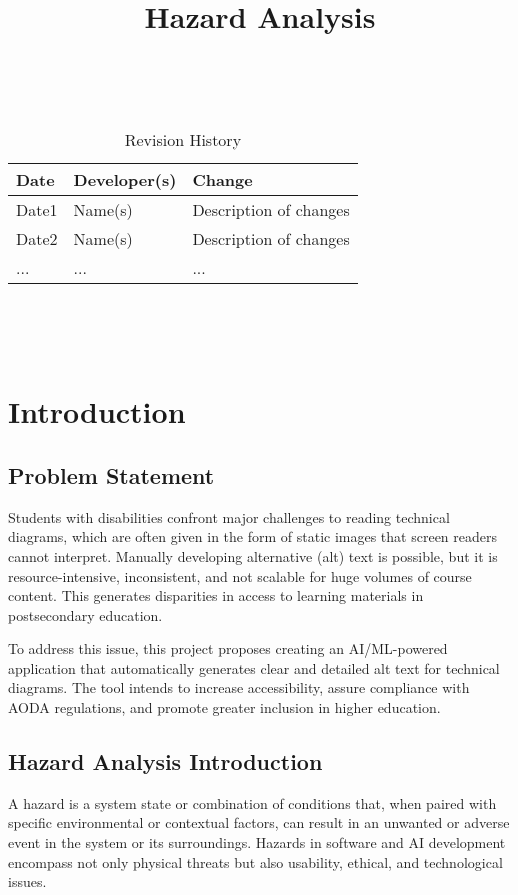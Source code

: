 \documentclass{article}
\title{Hazard Analysis\\\progname}
\author{\authname}
\date{}
\begin{document}
\maketitle
\thispagestyle{empty}

~\newpage


\begin{table}[hp]
  \caption{Revision History} \label{TblRevisionHistory}
  \begin{tabularx}{\textwidth}{llX}
    \toprule
    \textbf{Date} & \textbf{Developer(s)} & \textbf{Change}\\
    \midrule
    Date1 & Name(s) & Description of changes\\
    Date2 & Name(s) & Description of changes\\
    ... & ... & ...\\
    \bottomrule
  \end{tabularx}
\end{table}

~\newpage

\tableofcontents

~\newpage



\section{Introduction}

\subsection{Problem Statement}
Students with disabilities confront major challenges to reading technical diagrams, which are often given in the form of static images that screen readers cannot interpret. Manually developing alternative (alt) text is possible, but it is resource-intensive, inconsistent, and not scalable for huge volumes of course content. This generates disparities in access to learning materials in postsecondary education.

To address this issue, this project proposes creating an AI/ML-powered application that automatically generates clear and detailed alt text for technical diagrams. The tool intends to increase accessibility, assure compliance with AODA regulations, and promote greater inclusion in higher education.

\subsection{Hazard Analysis Introduction}
A hazard is a system state or combination of conditions that, when paired with specific environmental or contextual factors, can result in an unwanted or adverse event in the system or its surroundings. Hazards in software and AI development encompass not only physical threats but also usability, ethical, and technological issues.
\end{document}

